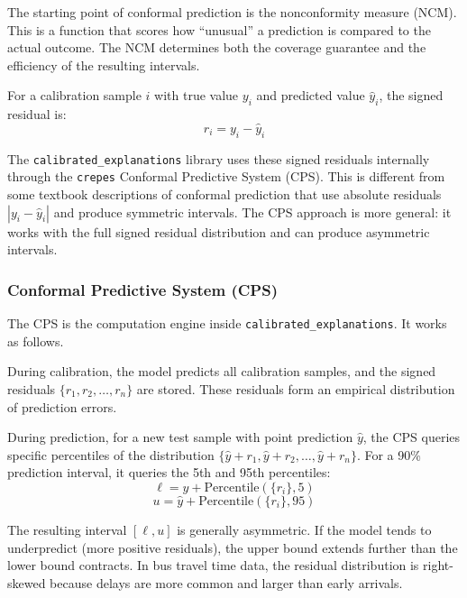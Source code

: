 \documentclass[12pt, a4paper, oneside]{report}
\begin{document}
The starting point of conformal prediction is the nonconformity measure (NCM). This is a function that scores how ``unusual'' a prediction is compared to the actual outcome. The NCM determines both the coverage guarantee and the efficiency of the resulting intervals.

For a calibration sample $i$ with true value $y_i$ and predicted value $\hat{y}_i$, the signed residual is:
\begin{equation}
    r_i = y_i - \hat{y}_i
    \label{eq:signed_residual}
\end{equation}

The \texttt{calibrated\_explanations} library uses these signed residuals internally through the \texttt{crepes} Conformal Predictive System (CPS). This is different from some textbook descriptions of conformal prediction that use absolute residuals $|y_i - \hat{y}_i|$ and produce symmetric intervals. The CPS approach is more general: it works with the full signed residual distribution and can produce asymmetric intervals.

\subsubsection{Conformal Predictive System (CPS)}

The CPS is the computation engine inside \texttt{calibrated\_explanations}. It works as follows.

During calibration, the model predicts all calibration samples, and the signed residuals $\{r_1, r_2, \ldots, r_n\}$ are stored. These residuals form an empirical distribution of prediction errors.

During prediction, for a new test sample with point prediction $\hat{y}$, the CPS queries specific percentiles of the distribution $\{\hat{y} + r_1, \hat{y} + r_2, \ldots, \hat{y} + r_n\}$. For a 90\% prediction interval, it queries the 5th and 95th percentiles:
\begin{equation}
    \ell = \hat{y} + \text{Percentile}(\{r_i\}, 5)
    \label{eq:cps_lower}
\end{equation}
\begin{equation}
    u = \hat{y} + \text{Percentile}(\{r_i\}, 95)
    \label{eq:cps_upper}
\end{equation}

The resulting interval $[\ell, u]$ is generally asymmetric. If the model tends to underpredict (more positive residuals), the upper bound extends further than the lower bound contracts. In bus travel time data, the residual distribution is right-skewed because delays are more common and larger than early arrivals.
\end{document}
